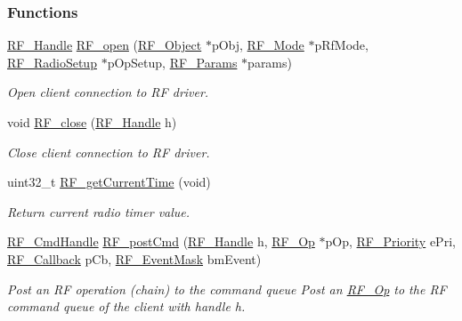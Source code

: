 \subsubsection*{Functions}
\begin{DoxyCompactItemize}
\item 
\hyperlink{_r_f_8h_a5e8ab7fc87fb818f435d9b6226ee573f}{R\+F\+\_\+\+Handle} \hyperlink{_r_f_8h_a13a7c6f5a2b797e0aac18fecfaba6f64}{R\+F\+\_\+open} (\hyperlink{struct_r_f___object}{R\+F\+\_\+\+Object} $\ast$p\+Obj, \hyperlink{struct_r_f___mode}{R\+F\+\_\+\+Mode} $\ast$p\+Rf\+Mode, \hyperlink{union_r_f___radio_setup}{R\+F\+\_\+\+Radio\+Setup} $\ast$p\+Op\+Setup, \hyperlink{struct_r_f___params}{R\+F\+\_\+\+Params} $\ast$params)
\begin{DoxyCompactList}\small\item\em Open client connection to R\+F driver. \end{DoxyCompactList}\item 
void \hyperlink{_r_f_8h_a9ff7e64561f7aa5526837521bceb5f88}{R\+F\+\_\+close} (\hyperlink{_r_f_8h_a5e8ab7fc87fb818f435d9b6226ee573f}{R\+F\+\_\+\+Handle} h)
\begin{DoxyCompactList}\small\item\em Close client connection to R\+F driver. \end{DoxyCompactList}\item 
uint32\+\_\+t \hyperlink{_r_f_8h_aedfdf0bdf0f64a071d50a6d78446fef4}{R\+F\+\_\+get\+Current\+Time} (void)
\begin{DoxyCompactList}\small\item\em Return current radio timer value. \end{DoxyCompactList}\item 
\hyperlink{_r_f_8h_acab1f56c62a9fd1ad0a91a46b6da23f1}{R\+F\+\_\+\+Cmd\+Handle} \hyperlink{_r_f_8h_a2b0ee444fcb74917df94eefea804ecbb}{R\+F\+\_\+post\+Cmd} (\hyperlink{_r_f_8h_a5e8ab7fc87fb818f435d9b6226ee573f}{R\+F\+\_\+\+Handle} h, \hyperlink{_r_f_8h_a47ea3dea78019340e8f8ceb854de5f02}{R\+F\+\_\+\+Op} $\ast$p\+Op, \hyperlink{_r_f_8h_ae5f9a893d178e64e6d0a7a783ea06e32}{R\+F\+\_\+\+Priority} e\+Pri, \hyperlink{_r_f_8h_a4d2ce6dc70b0f329dc5e249ec10c574a}{R\+F\+\_\+\+Callback} p\+Cb, \hyperlink{_r_f_8h_a128c46e18dbbaa781abb7abafc35233a}{R\+F\+\_\+\+Event\+Mask} bm\+Event)
\begin{DoxyCompactList}\small\item\em Post an R\+F operation (chain) to the command queue Post an \hyperlink{_r_f_8h_a47ea3dea78019340e8f8ceb854de5f02}{R\+F\+\_\+\+Op} to the R\+F command queue of the client with handle h. ~\newline

\end{DoxyCompactList}
\end{DoxyCompactItemize}
